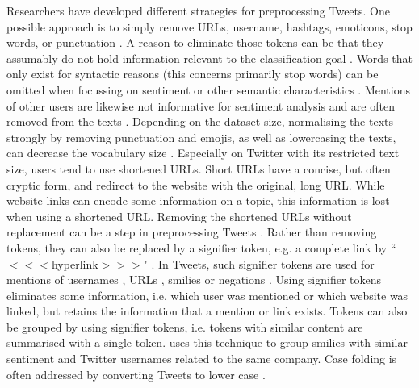 Researchers have developed different strategies for preprocessing Tweets. One possible approach is to simply remove URLs, username, hashtags, emoticons, stop words, or punctuation \cite{ghorai2016information, gupta2018proposed, hemalatha2012preprocessing, montani2018tuwienkbs, watanabe2018hate, xiang2012detecting}. A reason to eliminate those tokens can be that they assumably do not hold information relevant to the classification goal \cite{hemalatha2012preprocessing}. Words that only exist for syntactic reasons (this concerns primarily stop words) can be omitted when focussing on sentiment or other semantic characteristics \cite{ghorai2016information}. Mentions of other users are likewise not informative for sentiment analysis and are often removed from the texts \cite{watanabe2018hate, xiang2012detecting}. Depending on the dataset size, normalising the texts strongly by removing punctuation and emojis, as well as lowercasing the texts, can decrease the vocabulary size \cite{ghorai2016information}. Especially on Twitter with its restricted text size, users tend to use shortened URLs. Short URLs have a concise, but often cryptic form, and redirect to the website with the original, long URL. While website links can encode some information on a topic, this information is lost when using a shortened URL. Removing the shortened URLs without replacement can be a step in preprocessing Tweets \cite{xiang2012detecting}.\newline
Rather than removing tokens, they can also be replaced by a signifier token, e.g. a complete link by ``$<<<$hyperlink$>>>$" \cite{hovelmann2017fasttext}. In Tweets, such signifier tokens are used for mentions of usernames \cite{hovelmann2017fasttext, rother2018ulmfit, smailovic2013predictive}, URLs \cite{hovelmann2017fasttext, rother2018ulmfit, smailovic2013predictive}, smilies \cite{hovelmann2017fasttext} or negations \cite{smailovic2013predictive}. Using signifier tokens eliminates some information, i.e. which user was mentioned or which website was linked, but retains the information that a mention or link exists. Tokens can also be grouped by using signifier tokens, i.e. tokens with similar content are summarised with a single token. \cite{hovelmann2017fasttext} uses this technique to group smilies with similar sentiment and Twitter usernames related to the same company.\newline 
Case folding is often addressed by converting Tweets to lower case \cite{ghorai2016information, gupta2018proposed, hovelmann2017fasttext}.\newline

